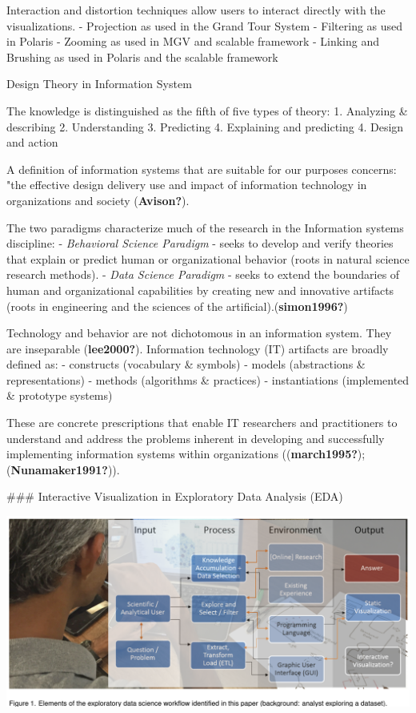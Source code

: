 \documentclass[print]{nuthesis}
\begin{document}
Interaction and distortion techniques allow users to interact directly with the visualizations.
- Projection as used in the Grand Tour System
- Filtering as used in Polaris
- Zooming as used in MGV and scalable framework
- Linking and Brushing as used in Polaris and the scalable framework

Design Theory in Information System

The knowledge is distinguished as the fifth of five types of theory:
1. Analyzing \& describing
2. Understanding
3. Predicting
4. Explaining and predicting
4. Design and action

A definition of information systems that are suitable for our purposes concerns: "the effective design delivery use and impact of information technology in organizations and society (\textbf{Avison?}).

The two paradigms characterize much of the research in the Information systems discipline:
- \emph{Behavioral Science Paradigm} - seeks to develop and verify theories that explain or predict human or organizational behavior (roots in natural science research methods).
- \emph{Data Science Paradigm} - seeks to extend the boundaries of human and organizational capabilities by creating new and innovative artifacts (roots in engineering and the sciences of the artificial).(\textbf{simon1996?})

Technology and behavior are not dichotomous in an information system. They are inseparable (\textbf{lee2000?}). Information technology (IT) artifacts are broadly defined as:
- constructs (vocabulary \& symbols)
- models (abstractions \& representations)
- methods (algorithms \& practices)
- instantiations (implemented \& prototype systems)

These are concrete prescriptions that enable IT researchers and practitioners to understand and address the problems inherent in developing and successfully implementing information systems within organizations ((\textbf{march1995?}); (\textbf{Nunamaker1991?})).

\#\#\# Interactive Visualization in Exploratory Data Analysis (EDA)

\begin{center}
\includegraphics[width=\textwidth]{figure/EDAWorkflowElements}
\end{center}
\end{document}
